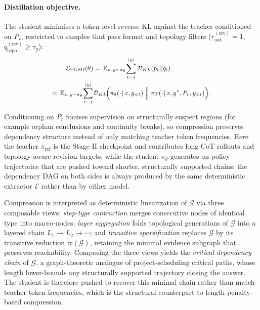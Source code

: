 \paragraph{Distillation objective.}
The student minimises a token-level reverse KL against the teacher conditioned on $P_r$, restricted to samples that pass format and topology filters ($r_{\mathrm{out}}^{(\mathrm{rev})}\!=\!1$, $q_{\mathrm{topo}}^{(\mathrm{rev})}\!\ge\!\tau_g$):
\begin{equation}
\label{eq:tgsd}
\small
\begin{aligned}
\mathcal{L}_{\mathrm{TGSD}}(\theta)
&=\,\mathbb{E}_{x,\,y\sim\pi_\theta}\!\sum_{t=1}^{|y|}
\mathcal{D}_{KL}(p_t||q_t)\\
=\,\mathbb{E}_{x,\,y\sim\pi_\theta}\!\sum_{t=1}^{|y|}
&\mathcal{D}_{KL}\!\Bigl(
\pi_\theta(\cdot\!\mid\!x,y_{<t})
\;\Big\|\;\pi_T(\cdot\!\mid\!x,y^*,P_r,y_{<t})
\Bigr).
\end{aligned}
\end{equation} %

Conditioning on $P_r$ focuses supervision on structurally suspect regions (for example orphan conclusions and continuity breaks), so compression preserves dependency structure instead of only matching teacher token frequencies.
Here the teacher $\pi_{\mathrm{ref}}$ is the Stage-II \method checkpoint and contributes long-CoT rollouts and topology-aware revision targets, while the student $\pi_\theta$ generates on-policy trajectories that are pushed toward shorter, structurally supported chains; the dependency DAG on both sides is always produced by the same deterministic extractor $\mathcal{E}$ rather than by either model.

Compression is interpreted as deterministic linearization of $\mathcal{G}$ via three composable views: \emph{step-type contraction} merges consecutive nodes of identical type into macro-nodes; \emph{layer aggregation} folds topological generations of $\mathcal{G}$ into a layered chain $L_1\!\to\!L_2\!\to\!\cdots$; and \emph{transitive sparsification} replaces $\mathcal{G}$ by its transitive reduction $\mathrm{tr}(\mathcal{G})$, retaining the minimal evidence subgraph that preserves reachability. Composing the three views yields the \emph{critical dependency chain} of $\mathcal{G}$, a graph-theoretic analogue of project-scheduling critical paths, whose length lower-bounds any structurally supported trajectory closing the answer. The student is therefore pushed to recover this minimal chain rather than match teacher token frequencies, which is the structural counterpart to length-penalty-based compression.

